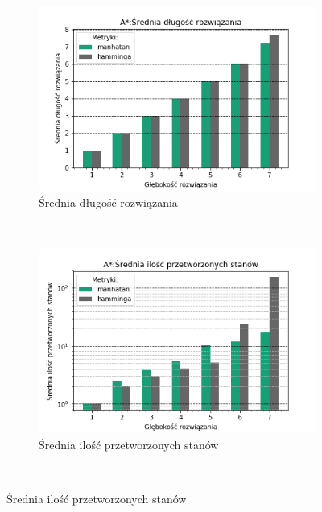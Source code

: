 \documentclass{classrep}
\begin{document}
\begin{figure}[H]
    \centering
    \begin{subfigure}[t]{0.45\textwidth}
        \includegraphics[width=\textwidth]{charts/ASTR_path_length.png}
        \caption{Średnia długość rozwiązania}
        \label{ASTR:path_length}
    \end{subfigure}
    ~ %
    \begin{subfigure}[t]{0.45\textwidth}
        \includegraphics[width=\textwidth]{charts/ASTR_processed.png}
        \caption{Średnia ilość przetworzonych stanów}
        \label{ASTR:processed}
    \end{subfigure}
    \qquad
    ~ %

\end{figure}
\end{document}
